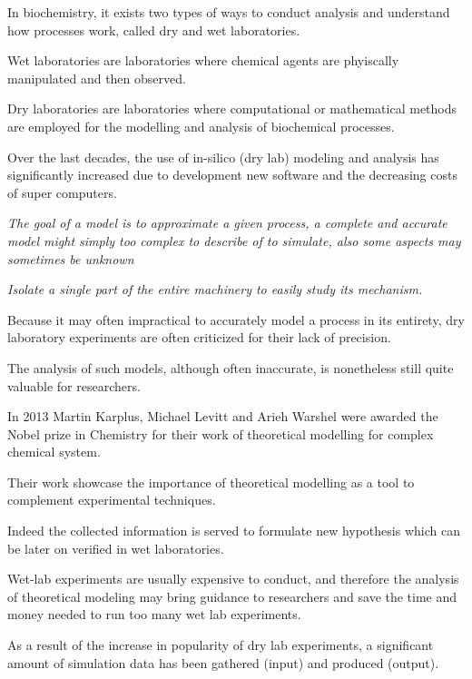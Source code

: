 %
%

In biochemistry, it exists two types of ways to conduct analysis and understand how processes work, called dry and wet laboratories.

Wet laboratories are laboratories where chemical agents are phyiscally manipulated and then observed.

Dry laboratories are laboratories where computational or mathematical methods are employed for the modelling and analysis of biochemical processes. 

Over the last decades, the use of in-silico (dry lab) modeling and analysis has significantly increased due to development new software and the decreasing costs of super computers.

\textit{The goal of a model is to approximate a given process, a complete and accurate model might simply too complex to describe of to simulate, also some aspects may sometimes be unknown}

\textit{Isolate a single part of the entire machinery to easily study its mechanism.}

Because it may often impractical to accurately model a process in its entirety, dry laboratory experiments are often criticized for their lack of precision.

The analysis of such models, although often inaccurate, is nonetheless still quite valuable for researchers.

In 2013 Martin Karplus, Michael Levitt and Arieh Warshel were awarded the Nobel prize in Chemistry for their work of theoretical modelling for complex chemical system.

Their work showcase the importance of theoretical modelling as a tool to complement experimental techniques.

Indeed the collected information is served to formulate new hypothesis which can be later on verified in wet laboratories.

Wet-lab experiments are usually expensive to conduct, and therefore the analysis of theoretical modeling may bring guidance to researchers and save the time and money needed to run too many wet lab experiments.

As a result of the increase in popularity of dry lab experiments, a significant amount of simulation data has been gathered (input) and produced (output).

